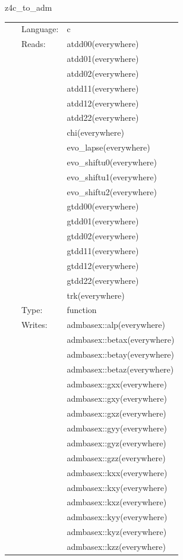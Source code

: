\hspace{5mm} z4c\_to\_adm 

\hspace{5mm}{\it function `z4c\_to\_adm` generated by einsteinengine. } 


\hspace{5mm}

 \begin{tabular*}{160mm}{cll} 
~ & Language:  & c \\ 
~ & Reads:  & atdd00(everywhere) \\ 
~& ~ &atdd01(everywhere)\\ 
~& ~ &atdd02(everywhere)\\ 
~& ~ &atdd11(everywhere)\\ 
~& ~ &atdd12(everywhere)\\ 
~& ~ &atdd22(everywhere)\\ 
~& ~ &chi(everywhere)\\ 
~& ~ &evo\_lapse(everywhere)\\ 
~& ~ &evo\_shiftu0(everywhere)\\ 
~& ~ &evo\_shiftu1(everywhere)\\ 
~& ~ &evo\_shiftu2(everywhere)\\ 
~& ~ &gtdd00(everywhere)\\ 
~& ~ &gtdd01(everywhere)\\ 
~& ~ &gtdd02(everywhere)\\ 
~& ~ &gtdd11(everywhere)\\ 
~& ~ &gtdd12(everywhere)\\ 
~& ~ &gtdd22(everywhere)\\ 
~& ~ &trk(everywhere)\\ 
~ & Type:  & function \\ 
~ & Writes:  & admbasex::alp(everywhere) \\ 
~& ~ &admbasex::betax(everywhere)\\ 
~& ~ &admbasex::betay(everywhere)\\ 
~& ~ &admbasex::betaz(everywhere)\\ 
~& ~ &admbasex::gxx(everywhere)\\ 
~& ~ &admbasex::gxy(everywhere)\\ 
~& ~ &admbasex::gxz(everywhere)\\ 
~& ~ &admbasex::gyy(everywhere)\\ 
~& ~ &admbasex::gyz(everywhere)\\ 
~& ~ &admbasex::gzz(everywhere)\\ 
~& ~ &admbasex::kxx(everywhere)\\ 
~& ~ &admbasex::kxy(everywhere)\\ 
~& ~ &admbasex::kxz(everywhere)\\ 
~& ~ &admbasex::kyy(everywhere)\\ 
~& ~ &admbasex::kyz(everywhere)\\ 
~& ~ &admbasex::kzz(everywhere)\\ 
\end{tabular*} 


